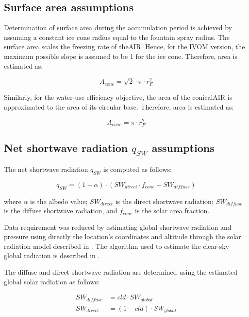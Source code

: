 \subsection{Surface area assumptions}

Determination of surface area during the accumulation period is achieved by assuming a constant ice cone
radius equal to the fountain spray radius. The surface area scales the freezing rate of the\ac{AIR}. Hence, for the
IVOM version, the maximum possible slope is assumed to be 1 for the ice cone. Therefore, area is estimated as:  

\begin{equation} A_{cone} =\sqrt{2} \cdot \pi \cdot r_{F}^2  \end{equation}

Similarly, for the water-use efficiency objective, the area of the conical\ac{AIR} is approximated to the area of
its circular base. Therefore, area is estimated as:

\begin{equation} A_{cone} =\pi \cdot r_{F}^2  \end{equation}

\subsection{Net shortwave radiation \texorpdfstring{$q_{SW}$}{Lg} assumptions}
\label{sec:SW}

The net shortwave radiation $q_{SW}$ is computed as follows:

\begin{equation} 
q_{SW} = (1- \alpha) \cdot ( SW_{direct} \cdot f_{cone} + SW_{diffuse})
\end{equation}

where $\alpha$ is the albedo value; $SW_{direct}$ is the direct shortwave radiation; $SW_{diffuse}$ is the
diffuse shortwave radiation, and $f_{cone}$ is the solar area fraction.

Data requirement was reduced by estimating global shortwave radiation and pressure using directly the
location's coordinates and altitude through the solar radiation model described in
\citet{holmgrenPvlibPythonPython2018}. The algorithm used to estimate the clear-sky global radiation is
described in \citet{ineichenBroadbandSimplifiedVersion2008}.  

The diffuse and direct shortwave radiation are determined using the estimated global solar radiation as follows:

\begin{equation}
\begin{split}
  SW_{diffuse} &= cld \cdot SW_{global}\\
  SW_{direct} &= (1-cld) \cdot SW_{global}
\end{split}
\end{equation}


